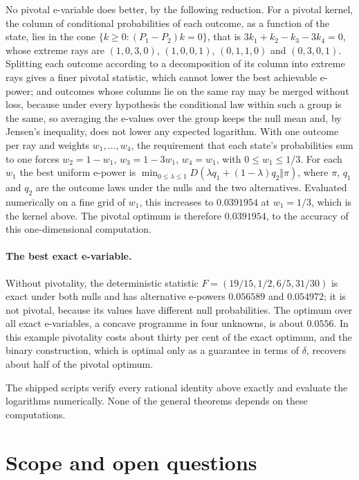 \documentclass[11pt,a4paper]{article}
\theoremstyle{definition}
\theoremstyle{remark}
\begin{document}
No pivotal e-variable does better, by the following reduction. For a pivotal kernel, the column of conditional probabilities of each outcome, as a function of the state, lies in the cone \(\{k\ge0:(P_1-P_2)k=0\}\), that is \(3k_1+k_2-k_3-3k_4=0\), whose extreme rays are \((1,0,3,0)\), \((1,0,0,1)\), \((0,1,1,0)\) and \((0,3,0,1)\). Splitting each outcome according to a decomposition of its column into extreme rays gives a finer pivotal statistic, which cannot lower the best achievable e-power; and outcomes whose columns lie on the same ray may be merged without loss, because under every hypothesis the conditional law within such a group is the same, so averaging the e-values over the group keeps the null mean and, by Jensen's inequality, does not lower any expected logarithm. With one outcome per ray and weights \(w_1,\dots,w_4\), the requirement that each state's probabilities sum to one forces \(w_2=1-w_1\), \(w_3=1-3w_1\), \(w_4=w_1\), with \(0\le w_1\le1/3\). For each \(w_1\) the best uniform e-power is \(\min_{0\le\lambda\le1}D(\lambda q_1+(1-\lambda)q_2\Vert\pi)\), where \(\pi\), \(q_1\) and \(q_2\) are the outcome laws under the nulls and the two alternatives. Evaluated numerically on a fine grid of \(w_1\), this increases to \(0.0391954\) at \(w_1=1/3\), which is the kernel above. The pivotal optimum is therefore \(0.0391954\), to the accuracy of this one-dimensional computation.

\paragraph{The best exact e-variable.} Without pivotality, the deterministic statistic \(F=(19/15,1/2,6/5,31/30)\) is exact under both nulls and has alternative e-powers \(0.056589\) and \(0.054972\); it is not pivotal, because its values have different null probabilities. The optimum over all exact e-variables, a concave programme in four unknowns, is about \(0.0556\). In this example pivotality costs about thirty per cent of the exact optimum, and the binary construction, which is optimal only as a guarantee in terms of \(\delta\), recovers about half of the pivotal optimum.

The shipped scripts verify every rational identity above exactly and evaluate the logarithms numerically. None of the general theorems depends on these computations.

\section{Scope and open questions}\label{sec:scope}
\end{document}
